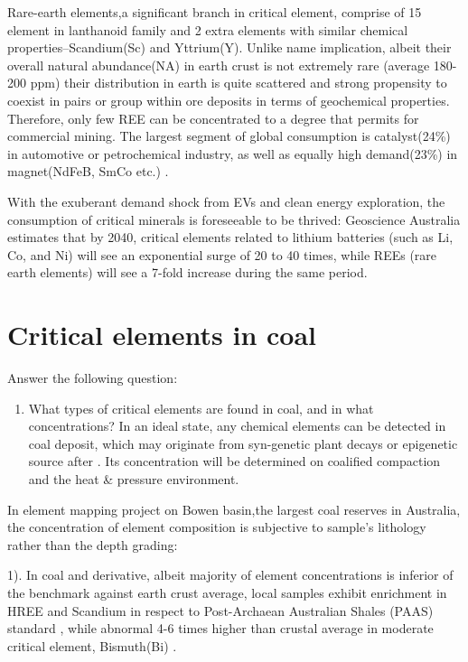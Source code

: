 \documentclass[preprint, 3p,
authoryear]{elsarticle} %
\providecommand{\tightlist}{%
  \setlength{\itemsep}{0pt}\setlength{\parskip}{0pt}}
\begin{document}
Rare-earth elements,a significant branch in critical element, comprise
of 15 element in lanthanoid family and 2 extra elements with similar
chemical properties--Scandium(Sc) and Yttrium(Y). Unlike name
implication, albeit their overall natural abundance(NA) in earth crust
is not extremely rare (average 180-200 ppm) their distribution in earth
is quite scattered and strong propensity to coexist in pairs or group
within ore deposits in terms of geochemical properties. Therefore, only
few REE can be concentrated to a degree that permits for commercial
mining. The largest segment of global consumption is catalyst(24\%) in
automotive or petrochemical industry, as well as equally high
demand(23\%) in magnet(NdFeB, SmCo etc.) \citet{Zhou2017}.

With the exuberant demand shock from EVs and clean energy exploration,
the consumption of critical minerals is foreseeable to be thrived:
Geoscience Australia estimates that by 2040, critical elements related
to lithium batteries (such as Li, Co, and Ni) will see an exponential
surge of 20 to 40 times, while REEs (rare earth elements) will see a
7-fold increase during the same period.

\hypertarget{critical-elements-in-coal}{%
\section{Critical elements in coal}\label{critical-elements-in-coal}}

Answer the following question:

\begin{enumerate}
\def\labelenumi{\arabic{enumi}.}
\setcounter{enumi}{1}
\tightlist
\item
  What types of critical elements are found in coal, and in what
  concentrations? In an ideal state, any chemical elements can be
  detected in coal deposit, which may originate from syn-genetic plant
  decays or epigenetic source after . Its concentration will be
  determined on coalified compaction and the heat \& pressure
  environment.
\end{enumerate}

In \citet{Hodgkinson2020} element mapping project on Bowen basin,the
largest coal reserves in Australia, the concentration of element
composition is subjective to sample's lithology rather than the depth
grading:

1). In coal and derivative, albeit majority of element concentrations is
inferior of the benchmark against earth crust average, local samples
exhibit enrichment in HREE and Scandium in respect to
\citet{McLennan2011} Post-Archaean Australian Shales (PAAS) standard ,
while abnormal 4-6 times higher than crustal average in moderate
critical element, Bismuth(Bi) .
\end{document}
